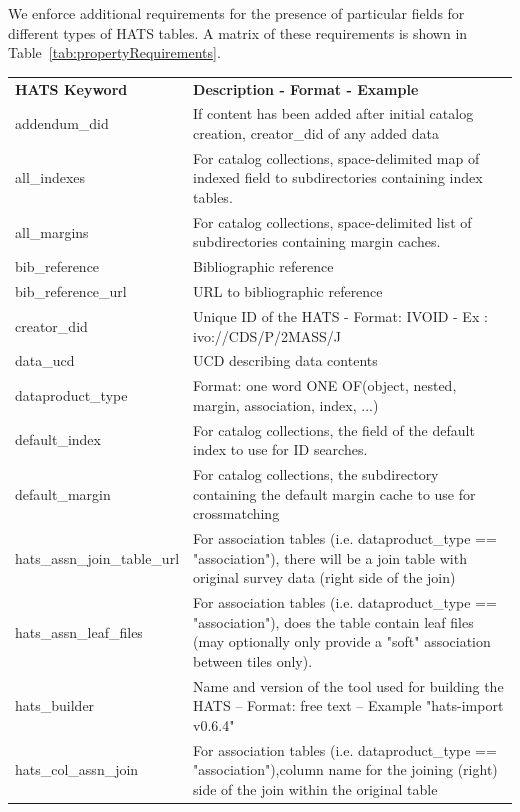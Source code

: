 \documentclass[11pt,a4paper]{ivoa}
\begin{document}
We enforce additional requirements for the presence of particular fields for different types of HATS tables. 
A matrix of these requirements is shown in Table~\ref{tab:propertyRequirements}.

\footnotesize\begin{longtable}[h!]{D{0.33\textwidth} D{0.67\textwidth}}
\sptablerule
\textbf{HATS Keyword}&\textbf{Description - Format - Example}\\
\sptablerule
\endhead

addendum\_did &If content has been added after initial catalog creation, creator\_did of any added data \\
all\_indexes &For catalog collections, space-delimited map of indexed field to subdirectories containing index tables. \\
all\_margins &For catalog collections, space-delimited list of subdirectories containing margin caches. \\
bib\_reference &Bibliographic reference \\
bib\_reference\_url &URL to bibliographic reference \\
creator\_did &Unique ID of the HATS - Format: IVOID - Ex : ivo://CDS/P/2MASS/J \\
data\_ucd &UCD describing data contents \\
dataproduct\_type &Format: one word ONE OF(object, nested, margin, association, index, ...) \\
default\_index &For catalog collections, the field of the default index to use for ID searches. \\
default\_margin &For catalog collections, the subdirectory containing the default margin cache to use for crossmatching \\
hats\_assn\_join\_table\_url &For association tables (i.e. dataproduct\_type == "association"), there will be a join table with original survey data (right side of the join) \\
hats\_assn\_leaf\_files &For association tables (i.e. dataproduct\_type == "association"), does the table contain leaf files (may optionally only provide a "soft" association between tiles only). \\
hats\_builder &Name and version of the tool used for building the HATS – Format: free text -- Example "hats-import v0.6.4" \\
hats\_col\_assn\_join &For association tables (i.e. dataproduct\_type == "association"),column name for the joining (right) side of the join within the original table \\

\end{longtable}
\end{document}
